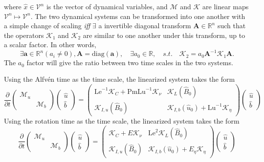 where $\hat{x} \in \mathcal{V}^n$ is the vector of dynamical variables, and $\mathcal{M}$ and $\mathcal{K}$ are linear maps $\mathcal{V}^n \mapsto \mathcal{V}^n$. 
The two dynamical systems can be transformed into one another with a simple change of scaling \textit{iff} $\exists$ a invertible diagonal transform $\mathbf{A} \in \mathbb{R}^n$ such that the operators $\mathcal{K}_1$ and $\mathcal{K}_2$ are similar to one another under this transform, up to a scalar factor. In other words,
\[
    \exists \mathbf{a} \in \mathbb{R}^n (a_i\neq 0), \mathbf{A} = \mathrm{diag}(\mathbf{a}),\quad \exists a_0 \in \mathbb{R}, \quad 
    s.t.\quad \mathcal{K}_2 = a_0 \mathbf{A}^{-1} \mathcal{K}_1 \mathbf{A}.
\]
The $a_0$ factor will give the ratio between two time scales in the two systems.

Using the Alfvén time as the time scale, the linearized system takes the form
\begin{equation}
    \frac{\partial}{\partial t} \begin{pmatrix} \mathcal{M}_u & \\ & \mathcal{M}_b \end{pmatrix}
    \begin{pmatrix} \hat{u} \\ \hat{b} \end{pmatrix} = 
    \begin{pmatrix}
        \mathrm{Le}^{-1} \mathcal{K}_C + \mathrm{Pm} \mathrm{Lu}^{-1} \mathcal{K}_\nu & \mathcal{K}_{L}(\hat{B}_0) \\ 
        \mathcal{K}_{I,u}(\hat{B}_0) & \mathcal{K}_{I,b}(\hat{u}_0) + \mathrm{Lu}^{-1} \mathcal{K}_\eta
    \end{pmatrix}
    \begin{pmatrix} \hat{u} \\ \hat{b} \end{pmatrix}
\end{equation}
Using the rotation time as the time scale, the linearized system takes the form
\begin{equation}
    \frac{\partial}{\partial t} \begin{pmatrix} \mathcal{M}_u & \\ & \mathcal{M}_b \end{pmatrix}
    \begin{pmatrix} \hat{u} \\ \hat{b} \end{pmatrix} = 
    \begin{pmatrix}
        \mathcal{K}_C + E \mathcal{K}_\nu & \mathrm{Le}^2 \mathcal{K}_{L}(\hat{B}_0) \\ 
        \mathcal{K}_{I,u}(\hat{B}_0) & \mathcal{K}_{I,b}(\hat{u}_0) + E_\eta \mathcal{K}_\eta
    \end{pmatrix}
    \begin{pmatrix} \hat{u} \\ \hat{b} \end{pmatrix}
\end{equation}
